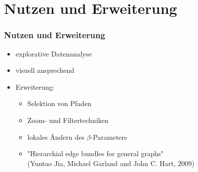 \documentclass[11pt]{beamer}
\begin{document}
\section{Nutzen und Erweiterung}
\begin{frame}
\frametitle{Nutzen und Erweiterung}

\begin{itemize}
\item explorative Datenanalyse
\item visuell ansprechend
\item Erweiterung:
\begin{itemize} 
\item Selektion von Pfaden
\item Zoom- und Filtertechniken
\item lokales Ändern des $\beta$-Parameters 
\item "Hierarchial edge bundles for general graphs" 
\\(Yuntao Jia, Michael Garland and John C. Hart, 2009)
\end{itemize}
\end{itemize}

\end{frame}
\end{document}
